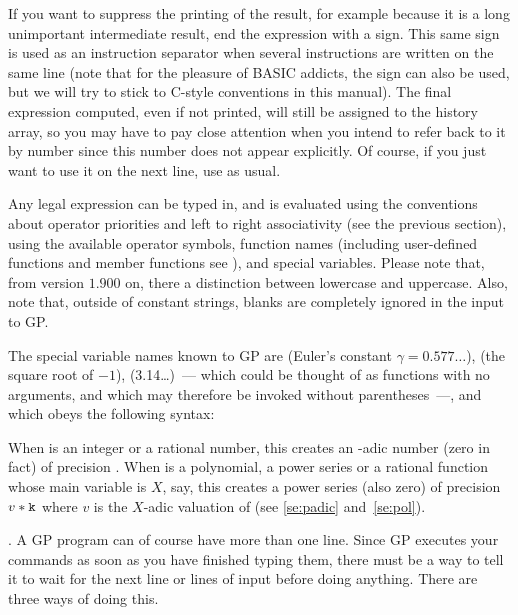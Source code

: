 If you want to suppress the printing of the result, for example because it
is a long unimportant intermediate result, end the expression with a
\kbd{;} sign. This same sign is used as an instruction separator when several
instructions are written on the same line (note that for the pleasure of BASIC
addicts, the \kbd{:} sign can also be used, but we will try to stick to
C-style conventions in this manual). The final expression computed, even
if not printed, will still be assigned to the history array, so you may have
to pay close attention when you intend to refer back to it by number since
this number does not appear explicitly. Of course, if you just want to use
it on the next line, use \kbd{\%} as usual.

Any legal expression can be typed in, and is evaluated using the
conventions about operator priorities and left to right associativity (see
the previous section), using the available operator symbols, function names
(including user-defined functions and member functions see
), and special variables. Please note that, from
version $1.900$ on, there  a distinction
between lowercase and uppercase. Also, note that, outside of constant
strings, blanks are completely ignored in the input to GP.

The special variable names known to GP are  (Euler's constant
$\gamma=0.577\dots$),  (the square root of $-1$), 
(3.14\dots)~--- which could be thought of as functions with no arguments, and
which may therefore be invoked without parentheses~---, and  which
obeys the following syntax:


\noindent
When  is an integer or a rational number, this creates an
-adic number (zero in fact) of precision . When 
is a polynomial, a power series or a rational function whose main variable is
$X$, say, this creates a power series (also zero) of precision $v*{\tt k}$
where $v$ is the $X$-adic valuation of  (see \ref{se:padic}
and~\ref{se:pol}).

. A GP program
can of course have more than one line. Since GP executes your commands as
soon as you have finished typing them, there must be a way to tell it to
wait for the next line or lines of input before doing anything. There are
three ways of doing this.


